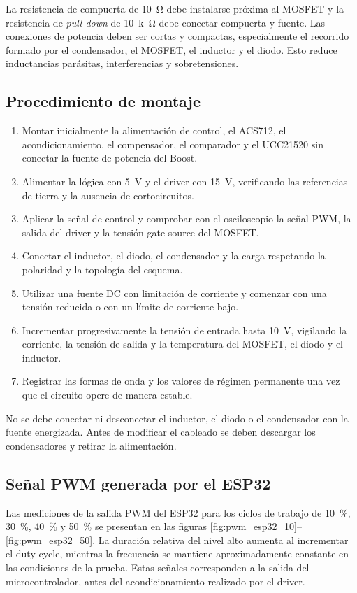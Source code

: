 \documentclass[12pt]{article}
\begin{document}
La resistencia de compuerta de \SI{10}{\ohm} debe instalarse próxima al MOSFET y la resistencia de \emph{pull-down} de \SI{10}{k\ohm} debe conectar compuerta y fuente. Las conexiones de potencia deben ser cortas y compactas, especialmente el recorrido formado por el condensador, el MOSFET, el inductor y el diodo. Esto reduce inductancias parásitas, interferencias y sobretensiones.

\subsection{Procedimiento de montaje}
\begin{enumerate}
	\item Montar inicialmente la alimentación de control, el ACS712, el acondicionamiento, el compensador, el comparador y el UCC21520 sin conectar la fuente de potencia del Boost.
	\item Alimentar la lógica con \SI{5}{V} y el driver con \SI{15}{V}, verificando las referencias de tierra y la ausencia de cortocircuitos.
	\item Aplicar la señal de control y comprobar con el osciloscopio la señal PWM, la salida del driver y la tensión gate-source del MOSFET.
	\item Conectar el inductor, el diodo, el condensador y la carga respetando la polaridad y la topología del esquema.
	\item Utilizar una fuente DC con limitación de corriente y comenzar con una tensión reducida o con un límite de corriente bajo.
	\item Incrementar progresivamente la tensión de entrada hasta \SI{10}{V}, vigilando la corriente, la tensión de salida y la temperatura del MOSFET, el diodo y el inductor.
	\item Registrar las formas de onda y los valores de régimen permanente una vez que el circuito opere de manera estable.
\end{enumerate}

No se debe conectar ni desconectar el inductor, el diodo o el condensador con la fuente energizada. Antes de modificar el cableado se deben descargar los condensadores y retirar la alimentación.

\subsection{Señal PWM generada por el ESP32}
Las mediciones de la salida PWM del ESP32 para los ciclos de trabajo de \SI{10}{\percent}, \SI{30}{\percent}, \SI{40}{\percent} y \SI{50}{\percent} se presentan en las figuras \ref{fig:pwm_esp32_10}--\ref{fig:pwm_esp32_50}. La duración relativa del nivel alto aumenta al incrementar el duty cycle, mientras la frecuencia se mantiene aproximadamente constante en las condiciones de la prueba. Estas señales corresponden a la salida del microcontrolador, antes del acondicionamiento realizado por el driver.
\end{document}
